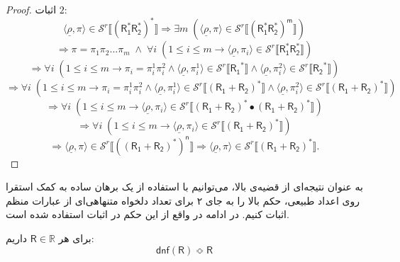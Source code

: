 \begin{proof}
	اثبات $2$:
	$$\langle\underline{\rho},\pi  \rangle \in \mathcal{S}^r \llbracket \mathsf{(R_1^* R_2^*)^*}\rrbracket \Rightarrow \exists m \; (\langle\underline{\rho},\pi  \rangle \in \mathcal{S}^r \llbracket \mathsf{(R_1^* R_2^*)^m}\rrbracket)$$
	$$\Rightarrow \pi=\pi_1\pi_2...\pi_m \;\land\;\forall i \; (1\leq i \leq m \rightarrow \langle\underline{\rho},\pi_i \rangle \in \mathcal{S}^r \llbracket \mathsf{R_1^* R_2^*}\rrbracket)$$
	$$\Rightarrow\forall i \; (1\leq i \leq m \rightarrow \pi_i=\pi_i^1 \pi_i^2 \land  \langle\underline{\rho},\pi_i^1  \rangle \in \mathcal{S}^r \llbracket \mathsf{R_1}^*\rrbracket \land \langle\underline{\rho},\pi_i^2  \rangle \in \mathcal{S}^r \llbracket \mathsf{R_2}^*\rrbracket)$$
	$$\Rightarrow\forall i \; (1\leq i \leq m \rightarrow \pi_i=\pi_i^1 \pi_i^2 \land  \langle\underline{\rho},\pi_i^1  \rangle \in \mathcal{S}^r \llbracket \mathsf{(R_1+R_2)}^*\rrbracket \land \langle\underline{\rho},\pi_i^2  \rangle \in \mathcal{S}^r \llbracket \mathsf{(R_1+R_2)}^*\rrbracket)$$
	$$\Rightarrow\forall i \; (1\leq i \leq m \rightarrow \langle\underline{\rho},\pi_i  \rangle \in \mathcal{S}^r \llbracket \mathsf{(R_1 + R_2)^*} \bullet \mathsf{(R_1 + R_2)^*}\rrbracket)$$
	$$\Rightarrow\forall i \; (1\leq i \leq m \rightarrow \langle\underline{\rho},\pi_i  \rangle \in \mathcal{S}^r \llbracket \mathsf{(R_1 + R_2)^*}\rrbracket)$$	
	$$\Rightarrow \langle\underline{\rho},\pi  \rangle \in \mathcal{S}^r \llbracket \mathsf{((R_1 + R_2)^*)^n}\rrbracket\Rightarrow \langle\underline{\rho},\pi  \rangle \in \mathcal{S}^r \llbracket \mathsf{(R_1 + R_2)^*}\rrbracket.$$
\end{proof}


به عنوان نتیجه‌ای از قضیه‌ی بالا، می‌توانیم با استفاده از یک برهان ساده به کمک استقرا روی اعداد طبیعی، حکم بالا را به جای ۲ برای تعداد دلخواه متنهاهی‌ای از عبارات منظم اثبات کنیم. در ادامه در واقع از این حکم در اثبات استفاده شده است.

\begin{thm}
	برای هر
	$\mathsf{R} \in \mathbb{R}$ 
	داریم:
	$$\mathsf{dnf(R) \Bumpeq R}$$
\end{thm}

